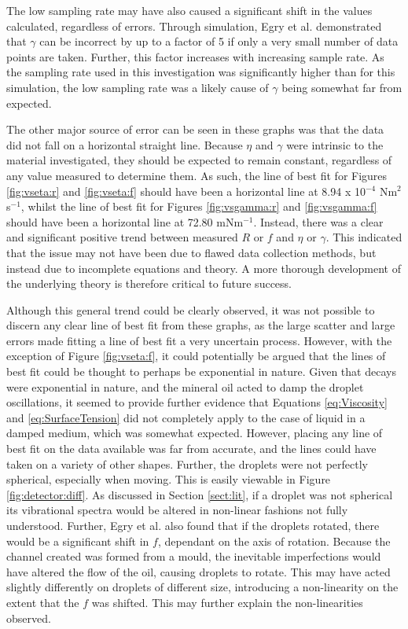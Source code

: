 \documentclass{physics_article_B}
\begin{document}
        The low sampling rate may have also caused a significant shift in the values calculated, regardless of errors. Through simulation, Egry et al. demonstrated\cite{egry} that $\gamma$ can be incorrect by up to a factor of 5 if only a very small number of data points are taken. Further, this factor increases with increasing sample rate. As the sampling rate used in this investigation was significantly higher than for this simulation, the low sampling rate was a likely cause of $\gamma$ being somewhat far from expected.
        
        The other major source of error can be seen in these graphs was that the data did not fall on a horizontal straight line. Because $\eta$ and $\gamma$ were intrinsic to the material investigated, they should be expected to remain constant, regardless of any value measured to determine them. As such, the line of best fit for Figures \ref{fig:vseta:r} and \ref{fig:vseta:f} should have been a horizontal line at 8.94 x 10$^{-4}$ Nm$^{2}$s$^{-1}$, whilst the line of best fit for Figures \ref{fig:vsgamma:r} and \ref{fig:vsgamma:f} should have been a horizontal line at 72.80 mNm$^{-1}$. Instead, there was a clear and significant positive trend between measured $R$ or $f$ and $\eta$ or $\gamma$. This indicated that the issue may not have been due to flawed data collection methods, but instead due to incomplete equations and theory. A more thorough development of the underlying theory is therefore critical to future success.
        
        Although this general trend could be clearly observed, it was not possible to discern any clear line of best fit from these graphs, as the large scatter and large errors made fitting a line of best fit a very uncertain process. However, with the exception of Figure \ref{fig:vseta:f}, it could potentially be argued that the lines of best fit could be thought to perhaps be exponential in nature. Given that decays were exponential in nature, and the mineral oil acted to damp the droplet oscillations, it seemed to provide further evidence that Equations \ref{eq:Viscosity} and \ref{eq:SurfaceTension} did not completely apply to the case of liquid in a damped medium, which was somewhat expected. However, placing any line of best fit on the data available was far from accurate, and the lines could have taken on a variety of other shapes. Further, the droplets were not perfectly spherical, especially when moving. This is easily viewable in Figure \ref{fig:detector:diff}. As discussed in Section \ref{sect:lit}, if a droplet was not spherical its vibrational spectra would be altered in non-linear fashions not fully understood. Further, Egry et al.\cite{egry} also found that if the droplets rotated, there would be a significant shift in $f$, dependant on the axis of rotation. Because the channel created was formed from a mould, the inevitable imperfections would have altered the flow of the oil, causing droplets to rotate. This may have acted slightly differently on droplets of different size, introducing a non-linearity on the extent that the $f$ was shifted. This may further explain the non-linearities observed. 
        
\end{document}

